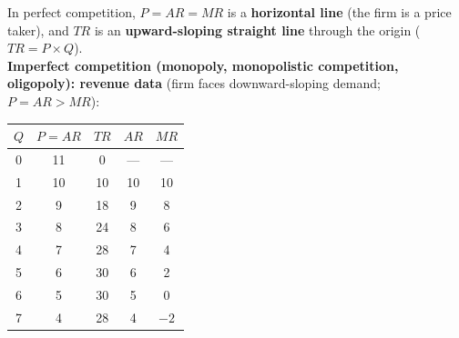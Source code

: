 In perfect competition, $P = AR = MR$ is a \textbf{horizontal line} (the firm is a price taker), and $TR$ is an \textbf{upward-sloping straight line} through the origin ($TR = P \times Q$).\\
\textbf{Imperfect competition (monopoly, monopolistic competition, oligopoly): revenue data} (firm faces downward-sloping demand; $P = AR > MR$):
\begin{center}
\begin{tabular}{ccccc}
\toprule
$Q$ & $P = AR$ & $TR$ & $AR$ & $MR$ \\
\midrule
0 & 11 & 0  & --- & --- \\
1 & 10 & 10 & 10 & 10 \\
2 & 9  & 18 & 9  & 8 \\
3 & 8  & 24 & 8  & 6 \\
4 & 7  & 28 & 7  & 4 \\
5 & 6  & 30 & 6  & 2 \\
6 & 5  & 30 & 5  & 0 \\
7 & 4  & 28 & 4  & $-2$ \\
\bottomrule
\end{tabular}
\end{center}
\begin{center}
\end{center}
